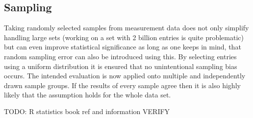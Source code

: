\subsection{Sampling}
Taking randomly selected samples from measurement data does not only simplify handling large sets (working on a set with 2 billion entries is quite problematic) but can even improve statistical significance as long as one keeps in mind, that random sampling error can also be introduced using this.
By selecting entries using a uniform distribution it is ensured that no unintentional sampling bias occurs. The intended evaluation is now applied onto multiple and independently drawn sample groups. If the results of every sample agree then it is also highly likely that the assumption holds for the whole data set.

TODO: R statistics book ref and information VERIFY
